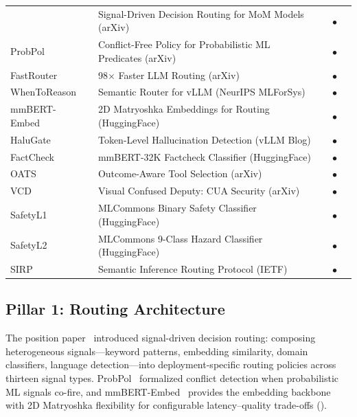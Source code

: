 \begin{table}[t]
\begin{tabularx}{\textwidth}{l X c c c}
\midrule
\rowcolor{lightgray}
\vsr{}~\cite{vllmsr2026}
  & Signal-Driven Decision Routing for MoM Models (arXiv) &  & $\bullet$ &  \\
ProbPol~\cite{probpol2026}
  & Conflict-Free Policy for Probabilistic ML Predicates (arXiv) &  & $\bullet$ &  \\
\rowcolor{lightgray}
FastRouter~\cite{fastrouter2026}
  & 98$\times$ Faster LLM Routing (arXiv) &  & $\bullet$ &  \\
WhenToReason~\cite{wang2025reason}
  & Semantic Router for vLLM (NeurIPS MLForSys) &  & $\bullet$ &  \\
\rowcolor{lightgray}
mmBERT-Embed~\cite{mmberted2025}
  & 2D Matryoshka Embeddings for Routing (HuggingFace) &  & $\bullet$ &  \\
HaluGate~\cite{halugate2025}
  & Token-Level Hallucination Detection (vLLM Blog) &  & $\bullet$ &  \\
\rowcolor{lightgray}
FactCheck~\cite{factcheck2026}
  & mmBERT-32K Factcheck Classifier (HuggingFace) &  & $\bullet$ &  \\
OATS~\cite{oats2026}
  & Outcome-Aware Tool Selection (arXiv) &  & $\bullet$ &  \\
\rowcolor{lightgray}
VCD~\cite{vcd2026}
  & Visual Confused Deputy: CUA Security (arXiv) &  & $\bullet$ &  \\
SafetyL1~\cite{safetyl1_2026}
  & MLCommons Binary Safety Classifier (HuggingFace) &  & $\bullet$ &  \\
\rowcolor{lightgray}
SafetyL2~\cite{safetyl2_2026}
  & MLCommons 9-Class Hazard Classifier (HuggingFace) &  & $\bullet$ &  \\
SIRP~\cite{sirp2025}
  & Semantic Inference Routing Protocol (IETF) &  & $\bullet$ &  \\
\bottomrule
\end{tabularx}
\end{table}


\subsection{Pillar 1: Routing Architecture}
\label{sec:foundation:routing}

The \vsr{} position paper~\cite{vllmsr2026} introduced
signal-driven decision routing: composing heterogeneous
signals---keyword patterns, embedding similarity, domain classifiers,
language detection---into deployment-specific routing policies across
thirteen signal types.  ProbPol~\cite{probpol2026}
formalized conflict detection when probabilistic ML signals co-fire,
and mmBERT-Embed~\cite{mmberted2025} provides the embedding backbone
with 2D Matryoshka flexibility for configurable
latency--quality trade-offs ().

